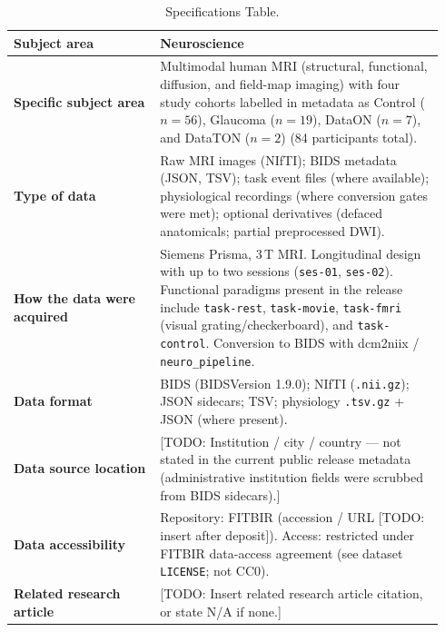 \begin{table}[H]
\centering
\caption{Specifications Table.}
\label{tab:specifications}
\begin{tabular}{@{}p{0.32\linewidth}p{0.62\linewidth}@{}}
\toprule
\textbf{Subject area} & Neuroscience \\
\midrule
\textbf{Specific subject area} &
Multimodal human MRI (structural, functional, diffusion, and field-map imaging)
with four study cohorts labelled in metadata as Control ($n=56$), Glaucoma ($n=19$),
DataON ($n=7$), and DataTON ($n=2$) (84 participants total). \\
\midrule
\textbf{Type of data} &
Raw MRI images (NIfTI); BIDS metadata (JSON, TSV); task event files (where available);
physiological recordings (where conversion gates were met); optional derivatives
(defaced anatomicals; partial preprocessed DWI). \\
\midrule
\textbf{How the data were acquired} &
Siemens Prisma, 3\,T MRI. Longitudinal design with up to two sessions
(\texttt{ses-01}, \texttt{ses-02}). Functional paradigms present in the release include
\texttt{task-rest}, \texttt{task-movie}, \texttt{task-fmri} (visual grating/checkerboard),
and \texttt{task-control}. Conversion to BIDS with dcm2niix / \texttt{neuro\_pipeline}. \\
\midrule
\textbf{Data format} &
BIDS (BIDSVersion 1.9.0); NIfTI (\texttt{.nii.gz}); JSON sidecars; TSV;
physiology \texttt{.tsv.gz} + JSON (where present). \\
\midrule
\textbf{Data source location} &
{[TODO: Institution / city / country --- not stated in the current public release metadata
(administrative institution fields were scrubbed from BIDS sidecars).]} \\
\midrule
\textbf{Data accessibility} &
Repository: FITBIR (accession / URL {[TODO: insert after deposit]}).
Access: restricted under FITBIR data-access agreement (see dataset \texttt{LICENSE}; not CC0). \\
\midrule
\textbf{Related research article} &
{[TODO: Insert related research article citation, or state N/A if none.]} \\
\bottomrule
\end{tabular}
\end{table}

